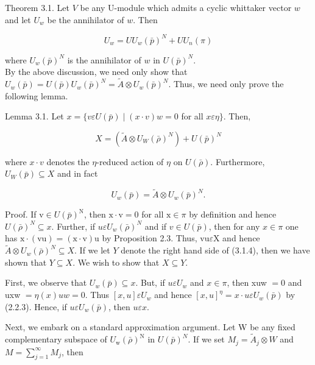 \documentclass[10pt]{article}
\begin{document}
Theorem 3.1. Let $V$ be any U-module which admits a cyclic whittaker vector $w$ and let $U_{w}$ be the annihilator of $w$. Then


\begin{equation*}
U_{w}=U U_{w}(\bar{p})^{N}+U U_{n}(\pi) \tag{3.1.2}
\end{equation*}


where $U_{w}(\bar{p})^{N}$ is the annihilator of $w$ in $U(\bar{p})^{N}$.\\
By the above discussion, we need only show that $U_{w}(\bar{p})=U(\bar{p}) U_{w}(\bar{p})^{N}=\tilde{A} \otimes U_{w}(\bar{p})^{N}$. Thus, we need only prove the following lemma.

Lemma 3.1. Let $x=\{v \varepsilon U(\bar{p}) \mid(x \cdot v) w=0$ for all $x \varepsilon \eta\}$. Then,


\begin{equation*}
X=\left(\tilde{A} \otimes U_{W}(\bar{\rho})^{N}\right)+U(\bar{p})^{N} \tag{3.1.3}
\end{equation*}


where $x \cdot v$ denotes the $\eta$-reduced action of $\eta$ on $U(\bar{\rho})$. Furthermore, $U_{W}(\bar{p}) \subseteq X$ and in fact


\begin{equation*}
U_{w}(\bar{p})=\tilde{A} \otimes U_{w}(\bar{p})^{N} . \tag{3.1.4}
\end{equation*}


Proof. If $\mathrm{v} \in U(\bar{p})^{\mathrm{N}}$, then $\mathrm{x} \cdot \mathrm{v}=0$ for all $\mathrm{x} \in \pi$ by definition and hence $U(\bar{\rho})^{N} \subseteq x$. Further, if $u \varepsilon U_{w}(\bar{\rho})^{N}$ and if $v \in U(\bar{p})$, then for any $x \in \pi$ one has $\mathrm{x} \cdot(\mathrm{vu})=(\mathrm{x} \cdot \mathrm{v}) \mathrm{u}$ by Proposition 2.3. Thus, $\mathrm{vu} \varepsilon \mathrm{X}$ and hence $\tilde{A} \otimes U_{w}(\bar{\rho})^{N} \subseteq X$. If we let $Y$ denote the right hand side of (3.1.4), then we have shown that $Y \subseteq X$. We wish to show that $X \subseteq Y$.

First, we observe that $U_{w}(\bar{p}) \subseteq x$. But, if $u \varepsilon U_{w}$ and $x \in \pi$, then xuw $=0$ and uxw $=\eta(x) u w=0$. Thus $[x, u] \varepsilon U_{w}$ and hence $[x, u]^{\eta}=x \cdot u \varepsilon U_{w}(\bar{p})$ by (2.2.3). Hence, if $u \varepsilon U_{w}(\bar{p})$, then $u \varepsilon x$.

Next, we embark on a standard approximation argument. Let W be any fixed complementary subspace of $U_{\mathrm{w}}(\bar{\rho})^{\mathrm{N}}$ in $U(\bar{p})^{N}$. If we set $M_{j}=\tilde{A}_{j} \otimes W$ and $M=\sum_{j=1}^{\infty} M_{j}$, then
\end{document}
